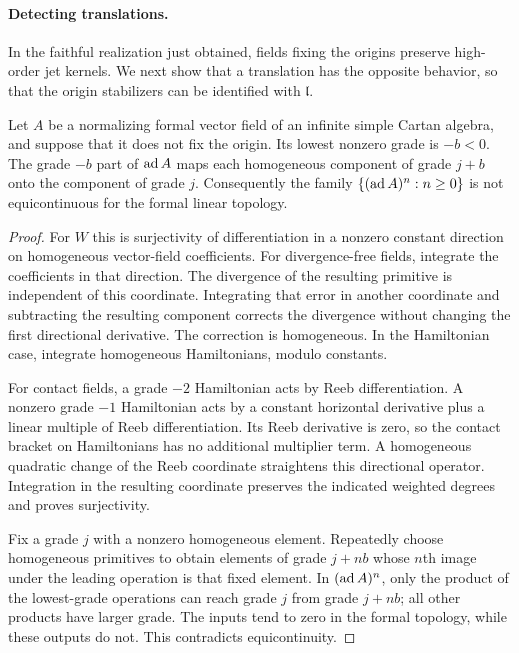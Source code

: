\paragraph{Detecting translations.}

In the faithful realization just obtained, fields fixing the origins
preserve high-order jet kernels. We next show that a translation has
the opposite behavior, so that the origin stabilizers can be identified
with $\mathfrak l$.

\begin{lemma}
\label{alg:translation-test}
Let $A$ be a normalizing formal vector field of an infinite simple
Cartan algebra, and suppose that it does not fix the origin. Its
lowest nonzero grade is $-b<0$. The grade $-b$ part of $\operatorname{ad} A$ maps
each homogeneous component of grade $j+b$ onto the component of
grade $j$. Consequently the family $\{(\operatorname{ad} A)^n:n\ge0\}$ is not
equicontinuous for the formal linear topology.
\end{lemma}

\begin{proof}
For $W$ this is surjectivity of differentiation in a nonzero constant
direction on homogeneous vector-field coefficients. For
divergence-free fields, integrate the coefficients in that direction.
The divergence of the resulting primitive is independent of this
coordinate. Integrating that error in another coordinate and
subtracting the resulting component corrects the divergence without
changing the first directional derivative. The correction is
homogeneous. In the Hamiltonian case, integrate homogeneous
Hamiltonians, modulo constants.

For contact fields, a grade $-2$ Hamiltonian acts by Reeb
differentiation. A nonzero grade $-1$ Hamiltonian acts by a constant
horizontal derivative plus a linear multiple of Reeb differentiation.
Its Reeb derivative is zero, so the contact bracket on Hamiltonians
has no additional multiplier term. A homogeneous quadratic change
of the Reeb coordinate straightens this directional operator.
Integration in the resulting coordinate preserves the indicated
weighted degrees and proves surjectivity.

Fix a grade $j$ with a nonzero homogeneous element. Repeatedly choose
homogeneous primitives to obtain elements of grade $j+nb$ whose
$n$th image under the leading operation is that fixed element.
In $(\operatorname{ad} A)^n$, only the product of the lowest-grade operations can
reach grade $j$ from grade $j+nb$; all other products have larger
grade. The inputs tend to zero in the formal topology, while these
outputs do not. This contradicts equicontinuity.
\end{proof}

